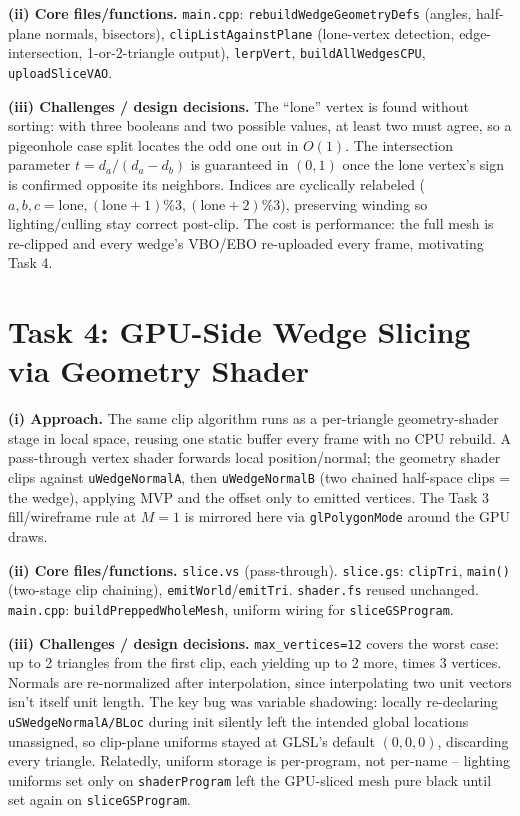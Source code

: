 \documentclass[10pt]{article}
\begin{document}
\textbf{(ii) Core files/functions.} \texttt{main.cpp}: \texttt{rebuildWedgeGeometryDefs} (angles, half-plane normals, bisectors), \texttt{clipListAgainstPlane} (lone-vertex detection, edge-intersection, 1-or-2-triangle output), \texttt{lerpVert}, \texttt{buildAllWedgesCPU}, \texttt{uploadSliceVAO}.

\textbf{(iii) Challenges / design decisions.} The ``lone'' vertex is found without sorting: with three booleans and two possible values, at least two must agree, so a pigeonhole case split locates the odd one out in $O(1)$. The intersection parameter $t=d_a/(d_a-d_b)$ is guaranteed in $(0,1)$ once the lone vertex's sign is confirmed opposite its neighbors. Indices are cyclically relabeled ($a,b,c=\text{lone},(\text{lone}{+}1)\%3,(\text{lone}{+}2)\%3$), preserving winding so lighting/culling stay correct post-clip. The cost is performance: the full mesh is re-clipped and every wedge's VBO/EBO re-uploaded every frame, motivating Task 4.

\section{Task 4: GPU-Side Wedge Slicing via Geometry Shader}
\textbf{(i) Approach.} The same clip algorithm runs as a per-triangle geometry-shader stage in local space, reusing one static buffer every frame with no CPU rebuild. A pass-through vertex shader forwards local position/normal; the geometry shader clips against \texttt{uWedgeNormalA}, then \texttt{uWedgeNormalB} (two chained half-space clips = the wedge), applying MVP and the offset only to emitted vertices. The Task 3 fill/wireframe rule at $M=1$ is mirrored here via \texttt{glPolygonMode} around the GPU draws.

\textbf{(ii) Core files/functions.} \texttt{slice.vs} (pass-through). \texttt{slice.gs}: \texttt{clipTri}, \texttt{main()} (two-stage clip chaining), \texttt{emitWorld}/\texttt{emitTri}. \texttt{shader.fs} reused unchanged. \texttt{main.cpp}: \texttt{buildPreppedWholeMesh}, uniform wiring for \texttt{sliceGSProgram}.

\textbf{(iii) Challenges / design decisions.} \texttt{max\_vertices=12} covers the worst case: up to 2 triangles from the first clip, each yielding up to 2 more, times 3 vertices. Normals are re-normalized after interpolation, since interpolating two unit vectors isn't itself unit length. The key bug was variable shadowing: locally re-declaring \texttt{uSWedgeNormalA/BLoc} during init silently left the intended global locations unassigned, so clip-plane uniforms stayed at GLSL's default $(0,0,0)$, discarding every triangle. Relatedly, uniform storage is per-program, not per-name -- lighting uniforms set only on \texttt{shaderProgram} left the GPU-sliced mesh pure black until set again on \texttt{sliceGSProgram}.
\end{document}
